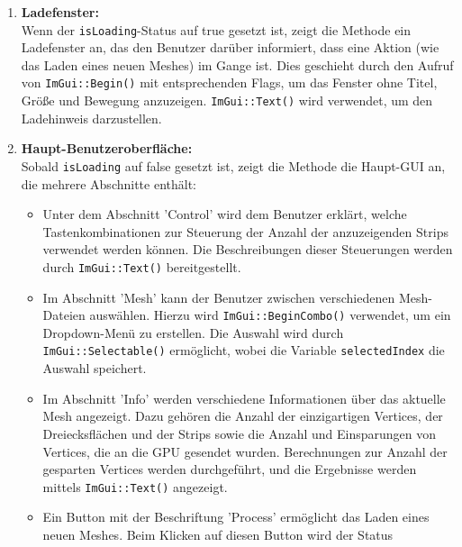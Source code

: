 \begin{enumerate}
    \item \textbf{Ladefenster:}
    \\
    Wenn der \lstinline{isLoading}-Status auf true gesetzt ist, zeigt die Methode
    ein Ladefenster an, das den Benutzer darüber informiert, dass eine Aktion (wie
    das Laden eines neuen Meshes) im Gange ist. Dies geschieht durch den Aufruf von
    \lstinline{ImGui::Begin()} mit entsprechenden Flags, um das Fenster ohne Titel, Größe und
    Bewegung anzuzeigen. \lstinline{ImGui::Text()} wird verwendet, um den Ladehinweis
    darzustellen.
    \\
    \item \textbf{Haupt-Benutzeroberfläche:} 
    \\ 
    Sobald \lstinline{isLoading} auf false
    gesetzt ist, zeigt die Methode die Haupt-GUI an, die mehrere Abschnitte
    enthält: 
    \\
    \begin{itemize}
        \item 
        Unter dem Abschnitt 'Control' wird dem Benutzer erklärt, welche
        Tastenkombinationen zur Steuerung der Anzahl der anzuzeigenden Strips
        verwendet werden können. Die Beschreibungen dieser Steuerungen werden
        durch \lstinline{ImGui::Text()} bereitgestellt.
        \\
        \item 
        Im Abschnitt 'Mesh' kann der Benutzer zwischen verschiedenen
        Mesh-Dateien auswählen. Hierzu wird \lstinline{ImGui::BeginCombo()}
        verwendet, um ein Dropdown-Menü zu erstellen. Die Auswahl wird durch
        \lstinline{ImGui::Selectable()} ermöglicht, wobei die Variable
        \lstinline{selectedIndex} die Auswahl speichert. \\
        \item 
        Im Abschnitt 'Info' werden verschiedene Informationen über das aktuelle
        Mesh angezeigt. Dazu gehören die Anzahl der einzigartigen Vertices, der
        Dreiecksflächen und der Strips sowie die Anzahl und Einsparungen von
        Vertices, die an die GPU gesendet wurden. Berechnungen zur Anzahl der
        gesparten Vertices werden durchgeführt, und die Ergebnisse werden
        mittels \lstinline{ImGui::Text()} angezeigt. 
        \\
        \item 
        Ein Button mit der Beschriftung 'Process' ermöglicht das
        Laden eines neuen Meshes. Beim Klicken auf diesen Button wird der Status

\end{itemize}
\end{enumerate}

